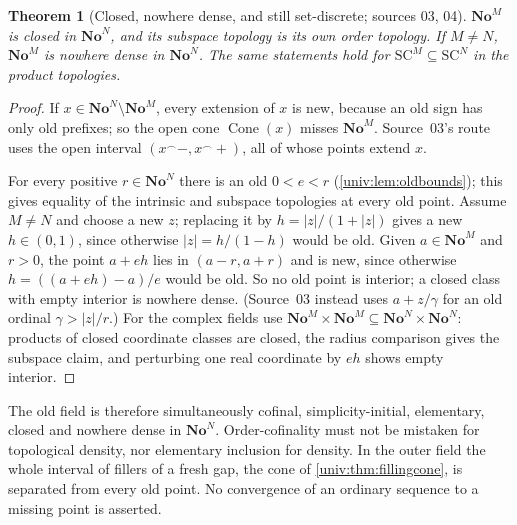 \documentclass[11pt,letterpaper]{article}
\numberwithin{equation}{section}
\newtheorem{theorem}{Theorem}[section]
\theoremstyle{definition}
\theoremstyle{remark}
\newcommand{\No}{\mathbf{No}}
\newcommand{\SC}{\mathrm{SC}}
\newcommand{\NoM}{\No^{M}}
\newcommand{\NoN}{\No^{N}}
\newcommand{\SCM}{\SC^{M}}
\newcommand{\SCN}{\SC^{N}}
\newcommand{\Cone}{\operatorname{Cone}}
\newcommand{\cat}{\mathbin{{}^{\frown}}}
\newcommand{\abs}[1]{\lvert#1\rvert}
\begin{document}
\begin{theorem}[Closed, nowhere dense, and still set-discrete; sources 03, 04]\label{univ:thm:nowheredense}
$\NoM$ is closed in $\NoN$, and its subspace topology is its own order
topology. If $M\ne N$, $\NoM$ is nowhere dense in $\NoN$. The same statements
hold for $\SCM\subseteq\SCN$ in the product topologies.
\end{theorem}
\begin{proof}
If $x\in\NoN\setminus\NoM$, every extension of $x$ is new, because an old sign
has only old prefixes; so the open cone $\Cone(x)$ misses $\NoM$. Source~03's
route uses the open interval $(x\cat-,x\cat+)$, all of whose points extend $x$.

For every positive $r\in\NoN$ there is an old $0<e<r$
(\cref{univ:lem:oldbounds}); this gives equality of the intrinsic and subspace
topologies at every old point. Assume $M\ne N$ and choose a new $z$; replacing
it by $h=\abs z/(1+\abs z)$ gives a new $h\in(0,1)$, since otherwise
$\abs z=h/(1-h)$ would be old. Given $a\in\NoM$ and $r>0$, the point $a+eh$ lies
in $(a-r,a+r)$ and is new, since otherwise $h=((a+eh)-a)/e$ would be old. So no
old point is interior; a closed class with empty interior is nowhere dense.
(Source~03 instead uses $a+z/\gamma$ for an old ordinal $\gamma>\abs z/r$.) For
the complex fields use $\NoM\times\NoM\subseteq\NoN\times\NoN$: products of
closed coordinate classes are closed, the radius comparison gives the subspace
claim, and perturbing one real coordinate by $eh$ shows empty interior.
\end{proof}

The old field is therefore simultaneously cofinal, simplicity-initial,
elementary, closed and nowhere dense in $\NoN$. Order-cofinality must not be
mistaken for topological density, nor elementary inclusion for density. In the
outer field the whole interval of fillers of a fresh gap, the cone of
\cref{univ:thm:fillingcone}, is separated from every old point. No convergence
of an ordinary sequence to a missing point is asserted.
\end{document}
